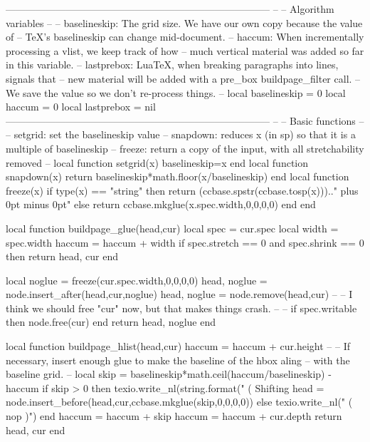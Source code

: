 

\makeatletter
%
%
\luacode
--------------------------------------------------------------------------------
--
-- Algorithm variables
--
-- baselineskip: The grid size. We have our own copy because the value of
--     TeX's baselineskip can change mid-document.
-- haccum: When incrementally processing a vlist, we keep track of how
--     much vertical material was added so far in this variable.
-- lastprebox: LuaTeX, when breaking paragraphs into lines, signals that
--     new material will be added with a pre_box buildpage_filter call.
--     We save the value so we don't re-process things.
--
local baselineskip = 0
local haccum = 0
local lastprebox = nil
--------------------------------------------------------------------------------
--
-- Basic functions
--
-- setgrid: set the baselineskip value
-- snapdown: reduces x (in sp) so that it is a multiple of baselineskip
-- freeze: return a copy of the input, with all stretchability removed
--
local function setgrid(x) baselineskip=x end
local function snapdown(x) return baselineskip*math.floor(x/baselineskip) end
local function freeze(x)
  if type(x) == "string" then
    return (ccbase.spstr(ccbase.tosp(x))).." plus 0pt minus 0pt"
  else
    return ccbase.mkglue(x.spec.width,0,0,0,0)
  end
end

local function buildpage_glue(head,cur)
  local spec = cur.spec
  local width = spec.width
  haccum = haccum + width
  if spec.stretch == 0 and spec.shrink == 0 then return head, cur end

  local noglue = freeze(cur.spec.width,0,0,0,0)
  head, noglue = node.insert_after(head,cur,noglue)
  head, noglue = node.remove(head,cur)
  --
  -- I think we should free "cur" now, but that makes things crash.
  --
  -- if spec.writable then node.free(cur) end
  return head, noglue
end

local function buildpage_hlist(head,cur)
  haccum = haccum + cur.height
  --
  -- If necessary, insert enough glue to make the baseline of the hbox aling
  -- with the baseline grid.
  --
  local skip = baselineskip*math.ceil(haccum/baselineskip) - haccum
  if skip > 0 then
    texio.write_nl(string.format("  ( Shifting %
    head = node.insert_before(head,cur,ccbase.mkglue(skip,0,0,0,0))
  else
    texio.write_nl("  ( nop )")
  end
  haccum = haccum + skip
  haccum = haccum + cur.depth
  return head, cur
end

